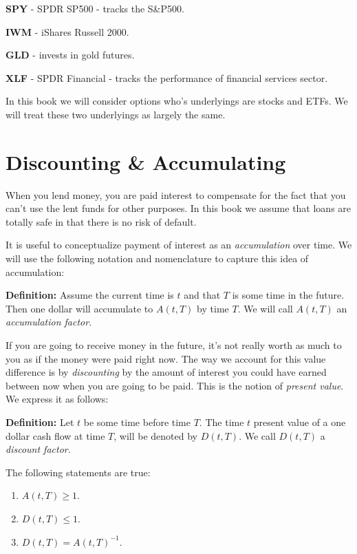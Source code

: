 \documentclass[11pt,]{krantz}
\begin{document}
\textbf{SPY} - SPDR SP500 - tracks the S\&P500.

\textbf{IWM} - iShares Russell 2000.

\textbf{GLD} - invests in gold futures.

\textbf{XLF} - SPDR Financial - tracks the performance of financial services sector.

In this book we will consider options who's underlyings are stocks and ETFs. We will treat these two underlyings as largely the same.

\section{Discounting \& Accumulating}\label{discounting-accumulating}

When you lend money, you are paid interest to compensate for the fact that you can't use the lent funds for other purposes. In this book we assume that loans are totally safe in that there is no risk of default.

It is useful to conceptualize payment of interest as an \emph{accumulation} over time. We will use the following notation and nomenclature to capture this idea of accumulation:

\textbf{Definition:} Assume the current time is \(t\) and that \(T\) is some time in the future. Then one dollar will accumulate to \(A(t,T)\) by time \(T\). We will call \(A(t,T)\) an \emph{accumulation factor}.

If you are going to receive money in the future, it's not really worth as much to you as if the money were paid right now. The way we account for this value difference is by \emph{discounting} by the amount of interest you could have earned between now when you are going to be paid. This is the notion of \emph{present value}. We express it as follows:

\textbf{Definition:} Let \(t\) be some time before time \(T\). The time \(t\) present value of a one dollar cash flow at time \(T\), will be denoted by \(D(t,T)\). We call \(D(t,T)\) a \emph{discount factor}.

The following statements are true:

\begin{enumerate}
\def\labelenumi{\arabic{enumi}.}
\item
  \(A(t,T) \geq 1\).
\item
  \(D(t, T) \leq 1\).
\item
  \(D(t,T) = A(t,T)^{-1}\).
\end{enumerate}
\end{document}
